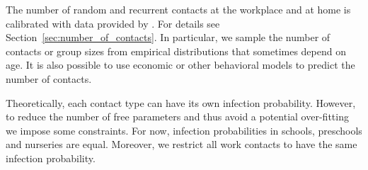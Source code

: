 The number of random and recurrent contacts at the workplace and at home is calibrated
with data provided by \citet{Mossong2008}. For details see
Section~\ref{sec:number_of_contacts}. In particular, we sample the number of contacts or
group sizes from empirical distributions that sometimes depend on age. It is also
possible to use economic or other behavioral models to predict the number of contacts.

Theoretically, each contact type can have its own infection probability. However, to
reduce the number of free parameters and thus avoid a potential over-fitting we impose
some constraints. For now, infection probabilities in schools, preschools and nurseries
are equal. Moreover, we restrict all work contacts to have the same infection
probability.
